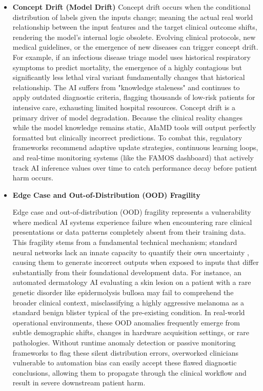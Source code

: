 \documentclass[11pt,a4paper]{article}
\begin{document}
\begin{itemize}
    \item \textbf{Concept Drift (Model Drift)}
Concept drift occurs when the conditional distribution of labels given the inputs change; meaning the actual real world relationship between the input features and the target clinical outcome shifts, rendering the model’s internal logic obsolete.
Evolving clinical protocols, new medical guidelines, or the emergence of new diseases can trigger concept drift. For example, if an infectious disease triage model uses historical respiratory symptoms to predict mortality, the emergence of a highly contagious but significantly less lethal viral variant fundamentally changes that historical relationship. The AI suffers from "knowledge staleness" and continues to apply outdated diagnostic criteria, flagging thousands of low-risk patients for intensive care, exhausting limited hospital resources. \cite{guan2026}
Concept drift is a primary driver of model degradation. Because the clinical reality changes while the model knowledge remains static, AIaMD tools will output perfectly formatted but clinically incorrect predictions. To combat this, regulatory frameworks recommend adaptive update strategies, continuous learning loops, and real-time monitoring systems (like the FAMOS dashboard) that actively track AI inference values over time to catch performance decay before patient harm occurs. \cite{mhra2025}


    \item \textbf{Edge Case and Out-of-Distribution (OOD) Fragility}

   Edge case and out-of-distribution (OOD) fragility represents a  vulnerability where medical AI systems experience  failure when encountering rare clinical presentations or  data patterns completely absent from their training data. This fragility stems from a fundamental technical mechanism; standard neural networks lack an innate capacity to quantify their own uncertainty \cite{guo2017calibration} , causing them to generate incorrect outputs when exposed to inputs that differ substantially from their foundational development data. 
For instance, an automated dermatology AI evaluating a skin lesion on a patient with a rare genetic disorder like epidermolysis bullosa may fail to comprehend the broader clinical context, misclassifying a highly aggressive melanoma as a standard benign blister typical of the pre-existing condition.
In real-world operational environments, these OOD anomalies frequently emerge from subtle demographic shifts, changes in hardware acquisition settings, or rare pathologies. Without runtime anomaly detection or passive monitoring frameworks to flag these silent distribution errors, overworked clinicians vulnerable to automation bias can easily accept these flawed diagnostic conclusions, allowing them to propagate through the clinical workflow and result in severe downstream patient harm. 

\end{itemize}
\end{document}
